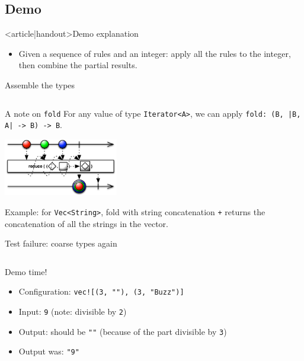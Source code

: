\subsection{Demo}

\begin{frame}<article|handout>{Demo explanation}
  \begin{itemize}
  \item Given a sequence of rules and an integer: apply all the rules to the integer, then combine the partial results.
  \end{itemize}

\end{frame}

\begin{frame}[label=first-general,fragile]{Assemble the types}
  \inputminted{rust}{FizzBuzz5.rs}
\end{frame}

\begin{frame}[fragile]{A note on \texttt{fold}}
  For any value of type \texttt{Iterator<A>}, we can apply \texttt{fold: (B, |B, A| -> B) -> B}.
  \begin{center}
    \includegraphics[height=2.5cm]{reduce.png}
  \end{center}

  Example: for \texttt{Vec<String>}, fold with string concatenation \texttt{+} returns the concatenation of all the strings in the vector.
\end{frame}

\begin{frame}[fragile]{Test failure: coarse types again}
  \inputminted{console}{testQuick9.console}

  \begin{block}{Demo time!}
    \begin{itemize}
    \item Configuration: \texttt{vec![(3, ""), (3, "Buzz")]}
    \item Input: \texttt{9} (note: divisible by \texttt{2})
    \item Output: should be \texttt{""} (because of the part divisible by \texttt{3})
    \item Output was: \texttt{"9"}
    \end{itemize}
  \end{block}
\end{frame}

